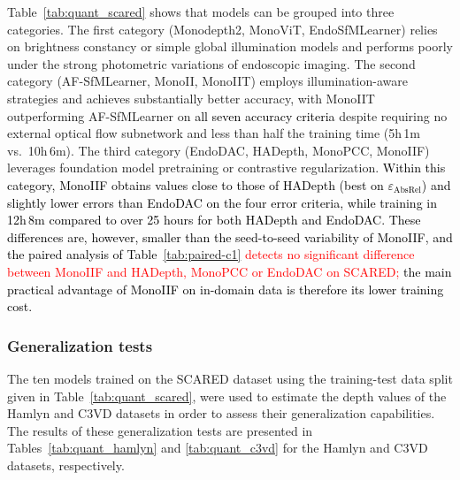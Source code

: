 \documentclass[a4paper,fleqn]{cas-dc}
\begin{document}


Table~\ref{tab:quant_scared} shows that models can be grouped into three categories. The first category (Monodepth2, MonoViT, EndoSfMLearner) relies on brightness constancy or simple global illumination models and performs poorly under the strong photometric variations of endoscopic imaging. The second category (AF-SfMLearner, MonoII, MonoIIT) employs illumination-aware strategies and achieves substantially better accuracy, with MonoIIT outperforming AF-SfMLearner on \textcolor{black}{all seven accuracy criteria} despite requiring no external optical flow subnetwork and less than half the training time (5h\,1m vs.\ 10h\,6m). The third category (EndoDAC, HADepth, MonoPCC, MonoIIF) leverages foundation model pretraining or contrastive regularization. \textcolor{black}{ Within this category, MonoIIF obtains values close to those of HADepth (best on $\varepsilon_\text{AbsRel}$) and slightly lower errors than EndoDAC on the four error criteria, while training in 12h\,8m compared to over 25 hours for both HADepth and EndoDAC. These differences are, however, smaller than the seed-to-seed variability of MonoIIF, and the paired analysis of Table~\ref{tab:paired-c1} \textcolor{red}{detects no significant difference between MonoIIF and HADepth, MonoPCC or EndoDAC on SCARED;} the main practical advantage of MonoIIF on in-domain data is therefore its lower training cost.}

%
\subsubsection{Generalization tests}
%

The ten models trained on the SCARED dataset using the training-test data split given in  Table~\ref{tab:quant_scared}, were used to estimate the depth values of the Hamlyn and C3VD datasets in order to assess their generalization capabilities. The results of these generalization tests are presented in Tables~\ref{tab:quant_hamlyn} and \ref{tab:quant_c3vd} for the Hamlyn and C3VD datasets, respectively.
\end{document}
